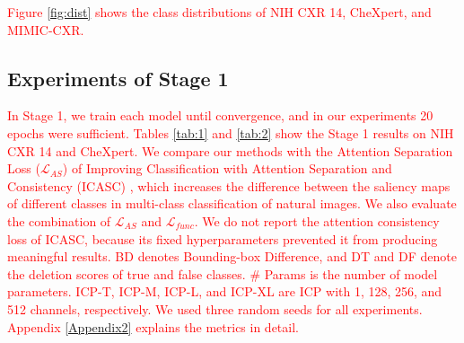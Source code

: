 \documentclass[preprint,7pt, a4paper]{elsarticle}
\begin{document}
\textcolor{red}{Figure \ref{fig:dist} shows the class distributions of NIH CXR 14, CheXpert, and MIMIC-CXR.}

\subsection{Experiments of Stage 1}

\textcolor{red}{In Stage 1, we train each model until convergence, and in our experiments 20 epochs were sufficient. Tables \ref{tab:1} and \ref{tab:2} show the Stage 1 results on NIH CXR 14 and CheXpert. We compare our methods with the Attention Separation Loss ($\mathcal{L}_{AS}$) of Improving Classification with Attention Separation and Consistency (ICASC) \cite{7}, which increases the difference between the saliency maps of different classes in multi-class classification of natural images. We also evaluate the combination of $\mathcal{L}_{AS}$ and $\mathcal{L}_{func}$. We do not report the attention consistency loss of ICASC, because its fixed hyperparameters prevented it from producing meaningful results. BD denotes Bounding-box Difference, and DT and DF denote the deletion scores of true and false classes. \# Params is the number of model parameters. ICP-T, ICP-M, ICP-L, and ICP-XL are ICP with 1, 128, 256, and 512 channels, respectively. We used three random seeds for all experiments. Appendix \ref{Appendix2} explains the metrics in detail.}
\end{document}
